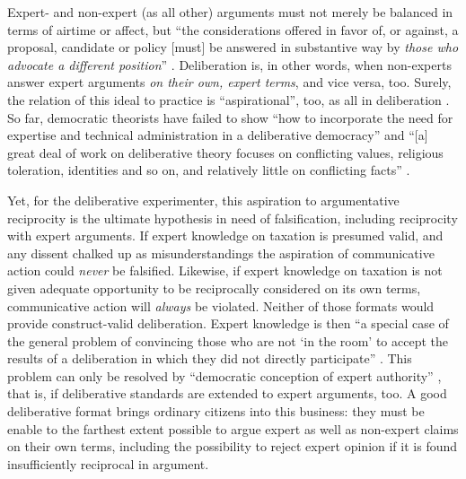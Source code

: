 Expert- and non-expert (as all other) arguments must not merely be balanced in terms of airtime or affect, but ``the considerations offered in favor of, or against, a proposal, candidate or policy [must] be answered in substantive way by \emph{those who advocate a different position}'' \citep[K550, emphasis added]{Fishkin2009}.
Deliberation is, in other words, when non-experts answer expert arguments \emph{on their own, expert terms}, and vice versa, too.
Surely, the relation of this ideal to practice is ``aspirational'', too, as all in deliberation \citep[K2679]{Fishkin2009}. 
So far, democratic theorists have failed to show ``how to incorporate the need for expertise and technical administration in a deliberative democracy'' \citep[515]{Thompson2008} and ``[a] great deal of work on deliberative theory focuses on conflicting values, religious toleration, identities and so on, and relatively little on conflicting facts'' \citep[2]{Moore2011}.

Yet, for the deliberative experimenter, this aspiration to argumentative reciprocity is the ultimate hypothesis in need of  falsification, including reciprocity with expert arguments.
If expert knowledge on taxation is presumed valid, and any dissent chalked up as misunderstandings the aspiration of communicative action could \emph{never} be falsified.
Likewise, if expert knowledge on taxation is not given adequate opportunity to be reciprocally considered on its own terms, communicative action will \emph{always} be violated.
Neither of those formats would provide construct-valid deliberation.
Expert knowledge is then ``a special case of the general problem of convincing those who are not `in the room' to accept the results of a deliberation in which they did not directly participate'' \citep[2]{Moore2011}.
This problem can only be resolved by ``democratic conception of expert authority'' \cite[2]{Moore2011}, that is, if deliberative standards are extended to expert arguments, too.
A good deliberative format brings ordinary citizens into this business: they must be enable to the farthest extent possible to argue expert as well as non-expert claims on their own terms, including the possibility to reject expert opinion if it is found insufficiently reciprocal in argument.

